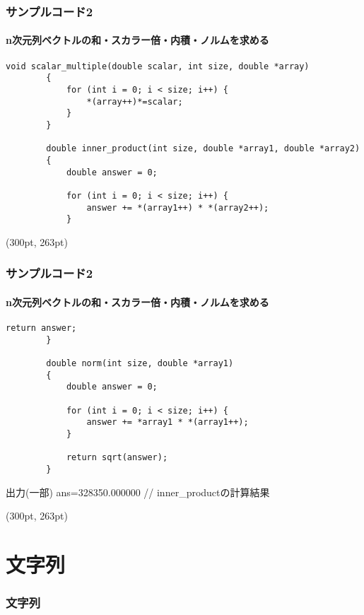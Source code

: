 \documentclass[dvipdfmx]{beamer}
\begin{document}
\begin{frame}[t, fragile]
    \frametitle{サンプルコード2}
    \framesubtitle{\textrm{n}次元列ベクトルの和・スカラー倍・内積・ノルムを求める}
    \begin{lstlisting}[gobble= 8, caption=pra\_pointer.c, firstnumber=52]
        void scalar_multiple(double scalar, int size, double *array)
        {
            for (int i = 0; i < size; i++) {
                *(array++)*=scalar;
            }   
        }

        double inner_product(int size, double *array1, double *array2)
        {
            double answer = 0;

            for (int i = 0; i < size; i++) {
                answer += *(array1++) * *(array2++);   
            }
    \end{lstlisting}
    \begin{textblock*}{0.3\linewidth}(300pt, 263pt)
        \space
    \end{textblock*}
\end{frame}

\begin{frame}[t, fragile]
    \frametitle{サンプルコード2}
    \framesubtitle{\textrm{n}次元列ベクトルの和・スカラー倍・内積・ノルムを求める}
    \begin{lstlisting}[gobble= 8, caption=pra\_pointer.c, firstnumber=67]
            return answer;
        }

        double norm(int size, double *array1)
        {
            double answer = 0;

            for (int i = 0; i < size; i++) {
                answer += *array1 * *(array1++);
            }
            
            return sqrt(answer);
        }
    \end{lstlisting}
    \vspace{-10pt}
    \begin{block}{出力(一部)}
        ans=328350.000000 // inner\_productの計算結果
    \end{block}
    \begin{textblock*}{0.3\linewidth}(300pt, 263pt)
        \space
    \end{textblock*}
\end{frame}

\section{文字列}
\begin{frame}
    \frametitle{文字列}
    \tableofcontents[sections={1,13}]
\end{frame}
\end{document}
